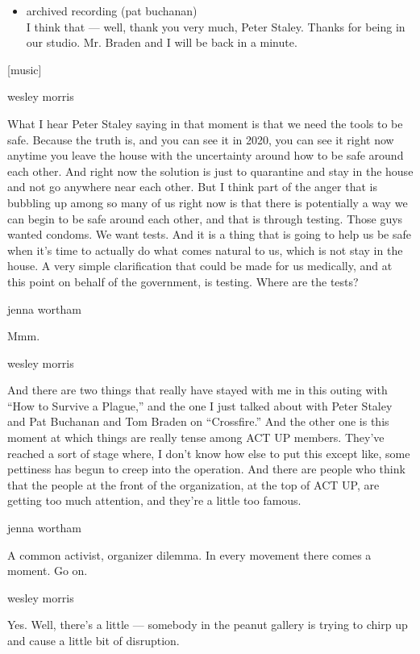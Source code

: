 \begin{itemize}
\tightlist
\item
  archived recording (pat buchanan)\\
  I think that --- well, thank you very much, Peter Staley. Thanks for
  being in our studio. Mr. Braden and I will be back in a minute.
\end{itemize}

{[}music{]}

wesley morris

What I hear Peter Staley saying in that moment is that we need the tools
to be safe. Because the truth is, and you can see it in 2020, you can
see it right now anytime you leave the house with the uncertainty around
how to be safe around each other. And right now the solution is just to
quarantine and stay in the house and not go anywhere near each other.
But I think part of the anger that is bubbling up among so many of us
right now is that there is potentially a way we can begin to be safe
around each other, and that is through testing. Those guys wanted
condoms. We want tests. And it is a thing that is going to help us be
safe when it's time to actually do what comes natural to us, which is
not stay in the house. A very simple clarification that could be made
for us medically, and at this point on behalf of the government, is
testing. Where are the tests?

jenna wortham

Mmm.

wesley morris

And there are two things that really have stayed with me in this outing
with ``How to Survive a Plague,'' and the one I just talked about with
Peter Staley and Pat Buchanan and Tom Braden on ``Crossfire.'' And the
other one is this moment at which things are really tense among ACT UP
members. They've reached a sort of stage where, I don't know how else to
put this except like, some pettiness has begun to creep into the
operation. And there are people who think that the people at the front
of the organization, at the top of ACT UP, are getting too much
attention, and they're a little too famous.

jenna wortham

A common activist, organizer dilemma. In every movement there comes a
moment. Go on.

wesley morris

Yes. Well, there's a little --- somebody in the peanut gallery is trying
to chirp up and cause a little bit of disruption.

